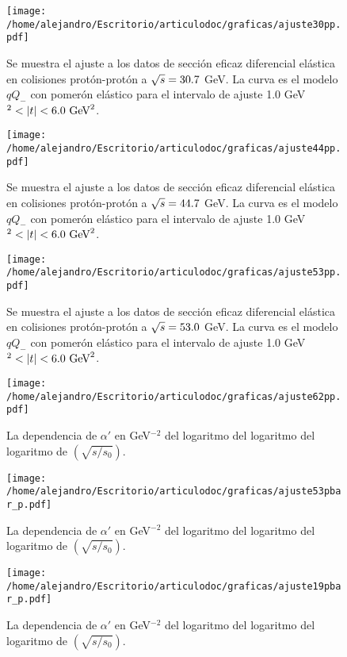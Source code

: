 \begin{figure}[H]\centering
\texttt{[image: /home/alejandro/Escritorio/articulodoc/graficas/ajuste30pp.pdf]}
\caption{\mismall Se muestra el ajuste a los datos de sección eficaz diferencial elástica en colisiones prot\'on-prot\'on a $\sqrt{s}=30\textup{.}7$ GeV. La curva es el modelo $qQ_{-}$ con pomer\'on elástico para el intervalo de ajuste 1.0 GeV$^2<|t|<\textup{6.0 GeV}^2$.}
\label{lafig_8}
\end{figure}\vskip -0.05cm
\begin{figure}[H]\centering
\texttt{[image: /home/alejandro/Escritorio/articulodoc/graficas/ajuste44pp.pdf]}
\caption{\mismall Se muestra el ajuste a los datos de sección eficaz diferencial elástica en colisiones prot\'on-prot\'on a $\sqrt{s}=44\textup{.}7$ GeV. La curva es el modelo $qQ_{-}$ con pomer\'on elástico para el intervalo de ajuste 1.0 GeV$^2<|t|<\textup{6.0 GeV}^2$.}
\label{lafig_9}
\end{figure}\vskip -0.05cm
\begin{figure}[H]\centering
\texttt{[image: /home/alejandro/Escritorio/articulodoc/graficas/ajuste53pp.pdf]}
\caption{\mismall Se muestra el ajuste a los datos de sección eficaz diferencial elástica en colisiones prot\'on-prot\'on a $\sqrt{s}=53\textup{.}0$ GeV. La curva es el modelo $qQ_{-}$ con pomer\'on elástico para el intervalo de ajuste 1.0 GeV$^2<|t|<\textup{6.0 GeV}^2$.}
\label{lafig_10}
\end{figure}
\begin{figure}[H]\centering
\texttt{[image: /home/alejandro/Escritorio/articulodoc/graficas/ajuste62pp.pdf]}
\caption{La dependencia de $\alpha'$ en GeV$^{-2}$ del logaritmo del logaritmo del logaritmo de $\left(\sqrt{s/s_{0}}\right)$.}
\label{lafig_11}
\end{figure}%
\begin{figure}[H]\centering
\texttt{[image: /home/alejandro/Escritorio/articulodoc/graficas/ajuste53pbar\_p.pdf]}
\caption{La dependencia de $\alpha'$ en GeV$^{-2}$ del logaritmo del logaritmo del logaritmo de $\left(\sqrt{s/s_{0}}\right)$.}
\label{lafig_12}
\end{figure}%
\begin{figure}[H]\centering
\texttt{[image: /home/alejandro/Escritorio/articulodoc/graficas/ajuste19pbar\_p.pdf]}
\caption{La dependencia de $\alpha'$ en GeV$^{-2}$ del logaritmo del logaritmo del logaritmo de $\left(\sqrt{s/s_{0}}\right)$.}
\label{lafig_13}
\end{figure}%